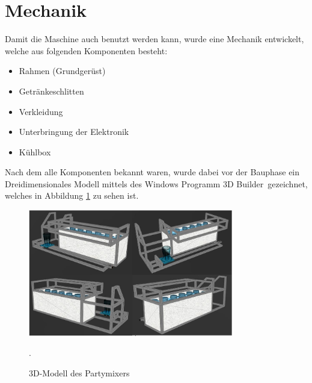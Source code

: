 \section{Mechanik}
\label{sec:Mechanik}

Damit die Maschine auch benutzt werden kann, wurde eine Mechanik entwickelt, welche aus folgenden Komponenten besteht: 

\begin{itemize}
\item Rahmen (Grundgerüst)
\item Getränkeschlitten 
\item Verkleidung
\item Unterbringung der Elektronik
\item Kühlbox
\end{itemize}

Nach dem alle Komponenten bekannt waren, wurde dabei vor der Bauphase ein Dreidimensionales Modell mittels des Windows Programm \flqq 3D Builder\frqq~gezeichnet, welches in Abbildung \ref{fig:3DModell} zu sehen ist. 

\begin{figure}[H]
	\centering
	\includegraphics[width=0.8\textwidth]{graphics/3DModell}
	\caption{3D-Modell des Partymixers}.
	\label{fig:3DModell}
\end{figure}


